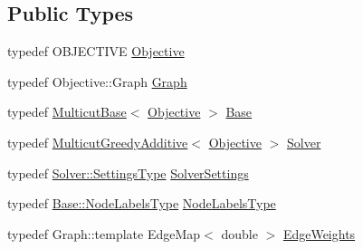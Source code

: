 \subsection*{Public Types}
\begin{DoxyCompactItemize}
\item 
typedef O\+B\+J\+E\+C\+T\+I\+V\+E \hyperlink{classnifty_1_1graph_1_1optimization_1_1multicut_1_1WatershedProposals_ab718f52fd4c86362784d507794123a77}{Objective}
\item 
typedef Objective\+::\+Graph \hyperlink{classnifty_1_1graph_1_1optimization_1_1multicut_1_1WatershedProposals_ae5682cdbd9df86644a5ff5f03149b959}{Graph}
\item 
typedef \hyperlink{classnifty_1_1graph_1_1optimization_1_1multicut_1_1MulticutBase}{Multicut\+Base}$<$ \hyperlink{classnifty_1_1graph_1_1optimization_1_1multicut_1_1WatershedProposals_ab718f52fd4c86362784d507794123a77}{Objective} $>$ \hyperlink{classnifty_1_1graph_1_1optimization_1_1multicut_1_1WatershedProposals_a830da5754c9f95076be49214815b3093}{Base}
\item 
typedef \hyperlink{classnifty_1_1graph_1_1optimization_1_1multicut_1_1MulticutGreedyAdditive}{Multicut\+Greedy\+Additive}$<$ \hyperlink{classnifty_1_1graph_1_1optimization_1_1multicut_1_1WatershedProposals_ab718f52fd4c86362784d507794123a77}{Objective} $>$ \hyperlink{classnifty_1_1graph_1_1optimization_1_1multicut_1_1WatershedProposals_a1be6a8728eb5896d77798bea92e7840e}{Solver}
\item 
typedef \hyperlink{classnifty_1_1graph_1_1optimization_1_1multicut_1_1MulticutGreedyAdditive_a5ab2bca40a57afb6cecb04e97204973b}{Solver\+::\+Settings\+Type} \hyperlink{classnifty_1_1graph_1_1optimization_1_1multicut_1_1WatershedProposals_a47d856b6946598de4414fe0c84bcf368}{Solver\+Settings}
\item 
typedef \hyperlink{classnifty_1_1graph_1_1optimization_1_1common_1_1SolverBase_a6e4e465f3b6e039882669fcfb9714818}{Base\+::\+Node\+Labels\+Type} \hyperlink{classnifty_1_1graph_1_1optimization_1_1multicut_1_1WatershedProposals_a73c2ef9e4f709718cd0ce6c6349a559b}{Node\+Labels\+Type}
\item 
typedef Graph\+::template Edge\+Map$<$ double $>$ \hyperlink{classnifty_1_1graph_1_1optimization_1_1multicut_1_1WatershedProposals_a8dc46879d28f37e1a8a8a79091a59e7f}{Edge\+Weights}
\end{DoxyCompactItemize}
